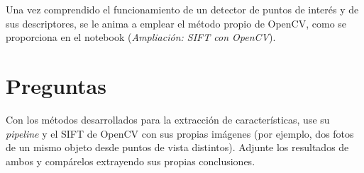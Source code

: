 Una vez comprendido el funcionamiento de un detector de puntos de interés y de sus descriptores, se le anima a emplear el método propio de OpenCV, como se proporciona en el notebook (\textit{Ampliación: SIFT con OpenCV}).

\section*{Preguntas}

\vspace{5mm}
\begin{tcolorbox}[colback=gray!10, colframe=gray!30, coltitle=black, title=Pregunta C.1: Correspondencia de imágenes propias y evaluación, halign=left]
Con los métodos desarrollados para la extracción de características, use su \textit{pipeline} y el SIFT de OpenCV con sus propias imágenes (por ejemplo, dos fotos de un mismo objeto desde puntos de vista distintos). Adjunte los resultados de ambos y compárelos extrayendo sus propias conclusiones.
\end{tcolorbox}
